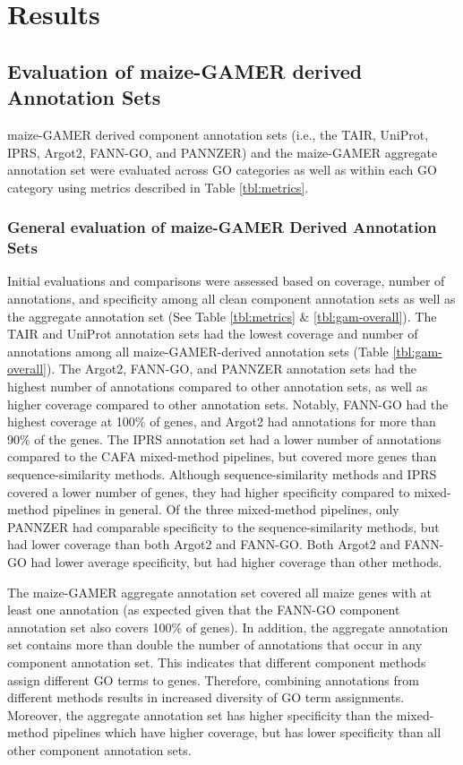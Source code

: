 \section{Results}
\subsection{Evaluation of maize-GAMER derived Annotation Sets}
maize-GAMER derived component annotation sets (i.e., the TAIR, UniProt, IPRS, Argot2, FANN-GO, and PANNZER) and the maize-GAMER aggregate annotation set were evaluated across GO categories as well as within each GO category using metrics described in Table \ref{tbl:metrics}.

\subsubsection{General evaluation of maize-GAMER Derived Annotation Sets}
Initial evaluations and comparisons were assessed based on coverage, number of annotations, and specificity among all clean component annotation sets as well as the aggregate annotation set (See Table \ref{tbl:metrics} \& \ref{tbl:gam-overall}). The TAIR and UniProt annotation sets had the lowest coverage and number of annotations among all maize-GAMER-derived annotation sets (Table \ref{tbl:gam-overall}). The Argot2, FANN-GO, and PANNZER annotation sets had the highest number of annotations compared to other annotation sets, as well as higher coverage compared to other annotation sets. Notably, FANN-GO had the highest coverage at 100\% of genes, and Argot2 had annotations for more than 90\% of the genes. The IPRS annotation set had a lower number of annotations compared to the CAFA mixed-method pipelines, but covered more genes than sequence-similarity methods. Although sequence-similarity methods and IPRS covered a lower number of genes, they had higher specificity compared to mixed-method pipelines in general. Of the three mixed-method pipelines, only PANNZER had comparable specificity to the sequence-similarity methods, but had lower coverage than both Argot2 and FANN-GO. Both Argot2 and FANN-GO had lower average specificity, but had higher coverage than other methods.

The maize-GAMER aggregate annotation set covered all maize genes with at least one annotation (as expected given that the FANN-GO component annotation set also covers 100\% of genes). In addition, the aggregate annotation set contains more than double the number of annotations that occur in any component annotation set. This indicates that different component methods assign different GO terms to genes. Therefore, combining annotations from different methods results in increased diversity of GO term assignments. Moreover, the aggregate annotation set has higher specificity than the mixed-method pipelines which have higher coverage, but has lower specificity than all other component annotation sets.

